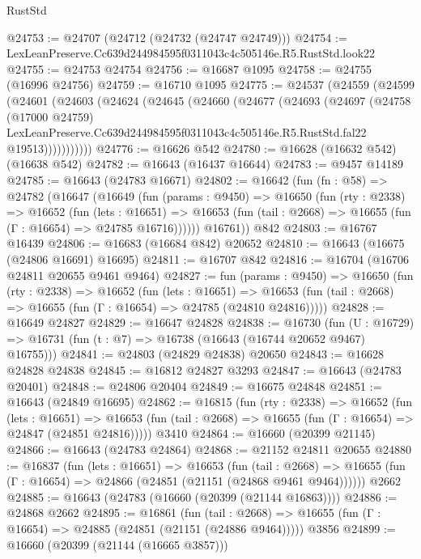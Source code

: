\begin{lexlean}{RustStd}
\begin{coremodule}
@24753 := @24707 (@24712 (@24732 (@24747 @24749)))
@24754 := LexLeanPreserve.Cc639d244984595f0311043c4c505146e.R5.RustStd.look22
@24755 := @24753 @24754
@24756 := @16687 @1095
@24758 := @24755 (@16996 @24756)
@24759 := @16710 @1095
@24775 := @24537
    (@24559
      (@24599
        (@24601
          (@24603
            (@24624
              (@24645
                (@24660
                  (@24677
                    (@24693
                      (@24697
                        (@24758
                          (@17000 @24759)
                          LexLeanPreserve.Cc639d244984595f0311043c4c505146e.R5.RustStd.fal22
                          @19513)))))))))))
@24776 := @16626 @542
@24780 := @16628 (@16632 @542) (@16638 @542)
@24782 := @16643 (@16437 @16644)
@24783 := @9457 @14189
@24785 := @16643 (@24783 @16671)
@24802 := @16642
    (fun (fn : @58) =>
    @24782
      (@16647
        (@16649
          (fun (params : @9450) =>
          @16650
            (fun (rty : @2338) =>
            @16652
              (fun (lets : @16651) =>
              @16653 (fun (tail : @2668) => @16655 (fun (Γ : @16654) => @24785 @16716))))))
        @16761))
    @842
@24803 := @16767 @16439
@24806 := @16683 (@16684 @842) @20652
@24810 := @16643 (@16675 (@24806 @16691) @16695)
@24811 := @16707 @842
@24816 := @16704 (@16706 @24811 @20655 @9461 @9464)
@24827 := fun (params : @9450) =>
  @16650
    (fun (rty : @2338) =>
    @16652
      (fun (lets : @16651) =>
      @16653 (fun (tail : @2668) => @16655 (fun (Γ : @16654) => @24785 (@24810 @24816)))))
@24828 := @16649 @24827
@24829 := @16647 @24828
@24838 := @16730
    (fun (U : @16729) => @16731 (fun (t : @7) => @16738 (@16643 (@16744 @20652 @9467) @16755)))
@24841 := @24803 (@24829 @24838) @20650
@24843 := @16628 @24828 @24838
@24845 := @16812 @24827 @3293
@24847 := @16643 (@24783 @20401)
@24848 := @24806 @20404
@24849 := @16675 @24848
@24851 := @16643 (@24849 @16695)
@24862 := @16815
    (fun (rty : @2338) =>
    @16652
      (fun (lets : @16651) =>
      @16653 (fun (tail : @2668) => @16655 (fun (Γ : @16654) => @24847 (@24851 @24816)))))
    @3410
@24864 := @16660 (@20399 @21145)
@24866 := @16643 (@24783 @24864)
@24868 := @21152 @24811 @20655
@24880 := @16837
    (fun (lets : @16651) =>
    @16653
      (fun (tail : @2668) =>
      @16655 (fun (Γ : @16654) => @24866 (@24851 (@21151 (@24868 @9461 @9464))))))
    @2662
@24885 := @16643 (@24783 (@16660 (@20399 (@21144 @16863))))
@24886 := @24868 @2662
@24895 := @16861
    (fun (tail : @2668) => @16655 (fun (Γ : @16654) => @24885 (@24851 (@21151 (@24886 @9464)))))
    @3856
@24899 := @16660 (@20399 (@21144 (@16665 @3857)))

\end{coremodule}
\end{lexlean}

